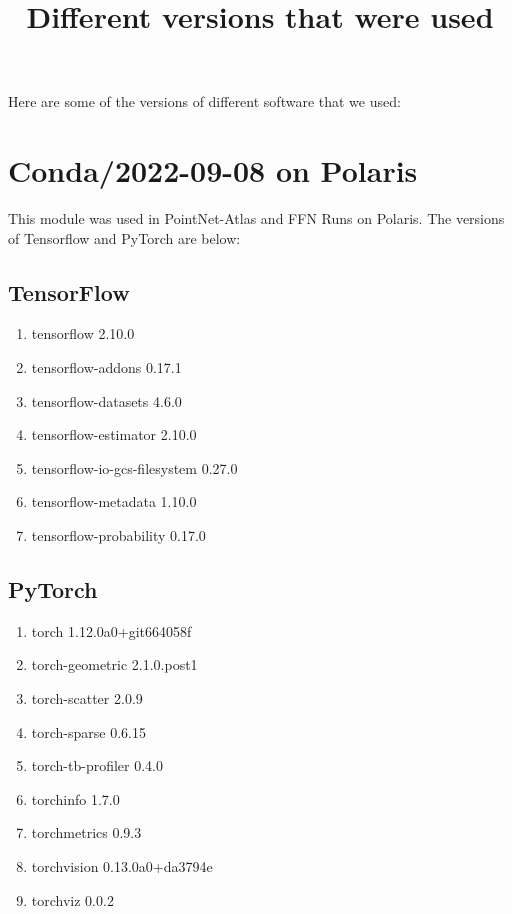 \documentclass{article}
\title{Different versions that were used}
\author{}
\begin{document}
\maketitle

Here are some of the versions of different software that we used:

\section{Conda/2022-09-08 on Polaris}

This module was used in PointNet-Atlas and FFN Runs on Polaris. The versions
of Tensorflow and PyTorch are below:

\subsection{TensorFlow}
\begin{enumerate}
\item tensorflow                2.10.0                   
\item tensorflow-addons         0.17.1                   
\item tensorflow-datasets       4.6.0                    
\item tensorflow-estimator      2.10.0                   
\item tensorflow-io-gcs-filesystem 0.27.0               
\item tensorflow-metadata       1.10.0                   
\item tensorflow-probability    0.17.0
\end{enumerate}

\subsection{PyTorch}
\begin{enumerate}
\item torch                     1.12.0a0+git664058f          
\item torch-geometric           2.1.0.post1              
\item torch-scatter             2.0.9                    
\item torch-sparse              0.6.15                   
\item torch-tb-profiler         0.4.0                    
\item torchinfo                 1.7.0                    
\item torchmetrics              0.9.3                    
\item torchvision               0.13.0a0+da3794e          
\item torchviz                  0.0.2                    
\end{enumerate}
\end{document}
